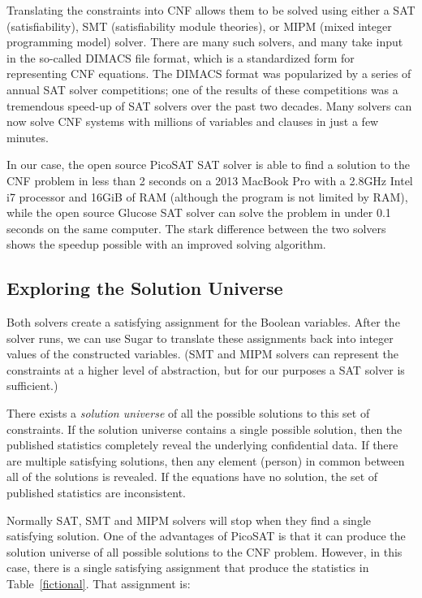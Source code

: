 \documentclass[runningheads]{llncs}
\begin{document}
Translating the constraints into CNF allows them to be solved using
either a SAT (satisfiability), SMT (satisfiability module theories),
or MIPM (mixed integer programming model) solver. There are many such
solvers, and many take input in the so-called DIMACS file
format, which is a standardized form for representing CNF equations. 
The DIMACS format was popularized by a series of annual SAT solver
competitions; one of the results of these competitions was a
tremendous speed-up of SAT solvers over the past two decades. Many
solvers can now solve CNF systems with millions of variables and
clauses in just a few minutes.

In our case, the open source
PicoSAT\cite{Biere_picosatessentials} SAT solver is able to find a
solution to the CNF problem in less than 2 seconds on a 2013 MacBook
Pro with a 2.8GHz Intel i7 processor and 16GiB of RAM (although the
program is not limited by RAM), while the open source Glucose SAT solver
can solve the problem in under 0.1 seconds on the same computer. The
stark difference between the two solvers shows the speedup possible
with an improved solving algorithm. 

\subsection{Exploring the Solution Universe}

Both solvers create a satisfying assignment for the \NumVariables{}
Boolean variables. After the solver runs, we can use Sugar to translate
these assignments back into integer values of the constructed
variables. (SMT and MIPM solvers can represent the constraints at a higher
level of abstraction, but for our purposes a SAT solver is
sufficient.)

There exists a \textit{solution universe} of all the possible
solutions to this set of constraints. If the solution
universe contains a single possible solution, then the published
statistics completely reveal the underlying confidential data. If
there are multiple satisfying solutions, then any element (person) in
common between all of the solutions is revealed. If the equations have
no solution, the set of published statistics are inconsistent.

Normally SAT, SMT and MIPM solvers will stop when they find a single
satisfying solution. One of the advantages of PicoSAT is that it can
produce the solution universe of all possible solutions to the CNF
problem. However, in this case, there is a single satisfying
assignment that produce the statistics in
Table~\ref{fictional}. That assignment is:
\end{document}
